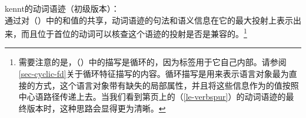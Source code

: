 \eas
kennt的动词语迹（初级版本）：\\
\label{le-verbspur-kennt}%
\zs
通过对（）中的\localvc 和\dslc 值的共享，动词语迹的句法和语义信息在它的最大投射上表示出来，而且位于首位的动词可以核查这个语迹的投射是否是兼容的。\footnote{%
需要注意的是，（）中的描写是循环的，因为标签用于它自己内部。请参阅\ref{sec-cyclic-fd}关于循环特征描写的内容。循环描写是用来表示语言对象最为直接的方式，这个语言对象带有缺失的局部属性，并且将这些信息作为\dslfc 的值按照中心语路径传递上去。当我们看到第\pageref{le-verbspur}页上的（\ref{le-verbspur}）的动词语迹的最终版本时，这种思路会显得更为清晰。
}


